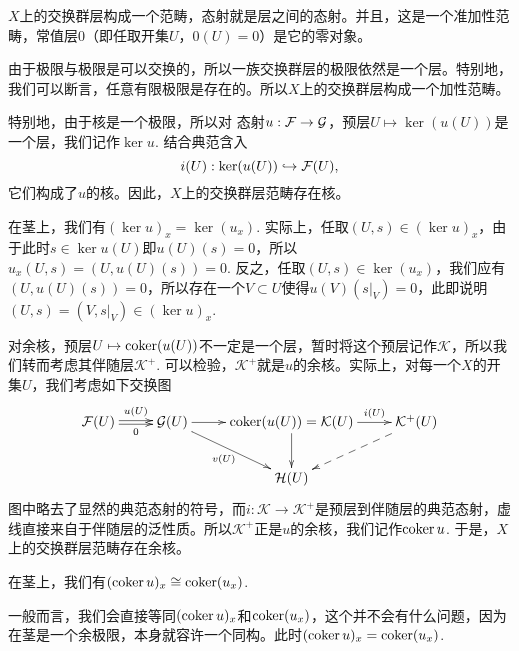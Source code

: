 \begin{para}[交换群层范畴]
$X$上的交换群层构成一个范畴，态射就是层之间的态射。并且，这是一个准加性范畴，常值层$0$（即任取开集$U$，$0(U)=0$）是它的零对象。

由于极限与极限是可以交换的，所以一族交换群层的极限依然是一个层。特别地，我们可以断言，任意有限极限是存在的。所以$X$上的交换群层构成一个加性范畴。

特别地，由于核是一个极限，所以对
态射$u:\mathcal{F}\to\mathcal{G}$，预层$U\mapsto \ker(u(U))$是一个层，我们记作$\ker u$. 结合典范含入
\[
	i(U):\ker(u(U))\hookrightarrow \mathcal{F}(U),
\]
它们构成了$u$的核。因此，$X$上的交换群层范畴存在核。

在茎上，我们有$(\ker u)_x=\ker(u_x)$. 实际上，任取$(U,s)\in (\ker u)_x$，由于此时$s\in \ker u(U)$即$u(U)(s)=0$，所以$u_x(U,s)=(U,u(U)(s))=0$. 反之，任取$(U,s)\in \ker(u_x)$，我们应有$(U,u(U)(s))=0$，所以存在一个$V\subset U$使得$u(V)(s|_V)=0$，此即说明$(U,s)=(V,s|_V)\in (\ker u)_x$.

对余核，预层$U\mapsto \operatorname{coker}(u(U))$不一定是一个层，暂时将这个预层记作$\mathcal{K}$，所以我们转而考虑其伴随层$\mathcal{K}^+$. 可以检验，$\mathcal{K}^+$就是$u$的余核。实际上，对每一个$X$的开集$U$，我们考虑如下交换图
\[
	\xymatrix{
		\calf(U)\ar@<0.3ex>[r]^-{u(U)} \ar@<-0.3ex>[r]_-{0}&\calg(U)\ar[r]\ar[dr]_-{v(U)}&\coker(u(U))=\mathcal{K}(U)\ar[d]\ar[r]^-{i(U)}&\mathcal{K}^+(U)\ar@{-->}[ld]\\
		&&\mathcal{H}(U)&
	}
\]
图中略去了显然的典范态射的符号，而$i:\mathcal{K}\to \mathcal{K}^+$是预层到伴随层的典范态射，虚线直接来自于伴随层的泛性质。所以$\mathcal{K}^+$正是$u$的余核，我们记作$\operatorname{coker} u$. 于是，$X$上的交换群层范畴存在余核。
\end{para}

\begin{lem}
在茎上，我们有$(\operatorname{coker} u)_x\cong \operatorname{coker}(u_x)$. 
\end{lem}

一般而言，我们会直接等同$(\operatorname{coker} u)_x$和$\operatorname{coker}(u_x)$，这个并不会有什么问题，因为在茎是一个余极限，本身就容许一个同构。此时$(\operatorname{coker} u)_x=\operatorname{coker}(u_x)$.

